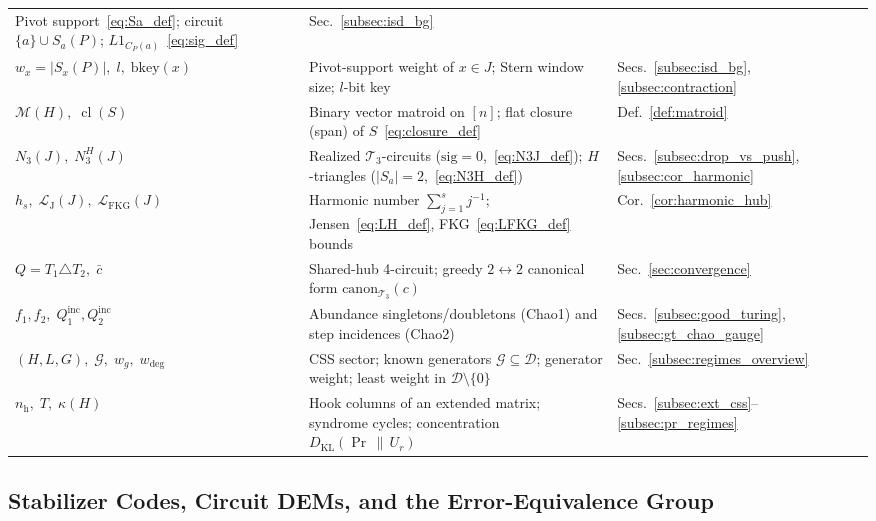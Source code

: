 \documentclass[12pt]{article}
\theoremstyle{definition}
\DeclareMathOperator{\cl}{cl}
\newcommand{\Dc}{\mathcal{D}}
\newcommand{\Tc}{\mathcal{T}_3}
\newcommand{\LH}{\mathcal{L}_{\mathrm{J}}}
\newcommand{\LFKG}{\mathcal{L}_{\mathrm{FKG}}}
\newcommand{\Gc}{\mathcal{G}}
\begin{document}
\begin{table}[htbp]
\begin{tabular}{@{}p{}>{\raggedright\arraybackslash}p{}l@{}}
  Pivot support~\eqref{eq:Sa_def}; circuit $\{a\} \cup S_a(P)$; $L 1_{C_P(a)}$~\eqref{eq:sig_def} &
  Sec.~\ref{subsec:isd_bg} \\
$w_x = |S_x(P)|,\; l,\; \mathrm{bkey}(x)$ &
  Pivot-support weight of $x \in J$; Stern window size; $l$-bit key & Secs.~\ref{subsec:isd_bg},
  \ref{subsec:contraction} \\
$\mathcal{M}(H),\; \cl(S)$ &
  Binary vector matroid on $[n]$; flat closure (span) of $S$~\eqref{eq:closure_def} &
  Def.~\ref{def:matroid} \\
$N_3(J),\; N_3^H(J)$ &
  Realized $\Tc$-circuits ($\mathrm{sig}=0$,~\eqref{eq:N3J_def}); $H$-triangles ($|S_a|=2$,~\eqref{eq:N3H_def}) &
  Secs.~\ref{subsec:drop_vs_push}, \ref{subsec:cor_harmonic} \\
$h_s,\; \LH(J),\; \LFKG(J)$ &
  Harmonic number $\sum_{j=1}^s j^{-1}$; Jensen~\eqref{eq:LH_def}, FKG~\eqref{eq:LFKG_def} bounds &
  Cor.~\ref{cor:harmonic_hub} \\
$Q = T_1 \triangle T_2,\; \bar{c}$ &
  Shared-hub 4-circuit; greedy $2 \leftrightarrow 2$ canonical form $\mathrm{canon}_{\Tc}(c)$ &
  Sec.~\ref{sec:convergence} \\
$f_1, f_2,\; Q_1^{\mathrm{inc}}, Q_2^{\mathrm{inc}}$ &
  Abundance singletons/doubletons (Chao1) and step incidences (Chao2) &
  Secs.~\ref{subsec:good_turing}, \ref{subsec:gt_chao_gauge} \\
$(H, L, G),\; \Gc,\; w_g,\; w_{\deg}$ &
  CSS sector; known generators $\Gc \subseteq \Dc$; generator weight; least weight in $\Dc \setminus \{0\}$ &
  Sec.~\ref{subsec:regimes_overview} \\
$n_{\mathrm{h}},\; T,\; \kappa(H)$ &
  Hook columns of an extended matrix; syndrome cycles; concentration $D_{\mathrm{KL}}(\Pr \,\|\, U_r)$ &
  Secs.~\ref{subsec:ext_css}--\ref{subsec:pr_regimes} \\
\bottomrule
\end{tabular}
\end{table}

\subsection{Stabilizer Codes, Circuit DEMs, and the Error-Equivalence Group}\label{subsec:dems}
\end{document}
